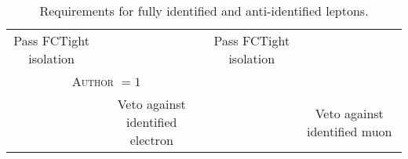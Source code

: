\begin{table}
{\begin{tabular}{c|c||c|c}
            Pass FCTight isolation                                               &                                                  & Pass FCTight isolation              &                                      \\
            \multicolumn{2}{c||}{ {\scshape Author} $= 1$}                       &                                                  &                                                                            \\
                                                                                 & Veto against identified electron                 &                                     & Veto against identified muon         \\
            \bottomrule
        \end{tabular}
    }
    \caption{Requirements for fully identified and anti-identified leptons.}
    \label{tab:leptonID}
\end{table}




